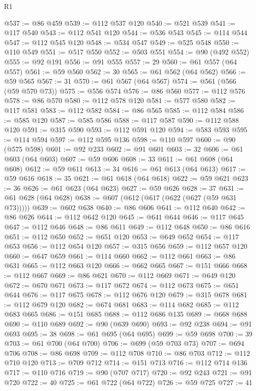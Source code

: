 \begin{lexlean}{R1}
\begin{coremodule}
@537 := @86 @459
@539 := @112 @537 @120
@540 := @521 @539
@541 := @117 @540
@543 := @112 @541 @120
@544 := @536 @543
@545 := @114 @544
@547 := @112 @545 @120
@548 := @534 @547
@549 := @525 @548
@550 := @110 @549
@551 := @517 @550
@552 := @503 @551
@554 := @90 (@492 @552)
@555 := @92 @191
@556 := @91 @555
@557 := 29
@560 := @61 @557 (@64 @557)
@561 := @59 @560
@562 := 30
@565 := @61 @562 (@64 @562)
@566 := @59 @565
@567 := 31
@570 := @61 @567 (@64 @567)
@574 := @561 (@566 (@59 @570 @73))
@575 := @556 @574
@576 := @86 @560
@577 := @112 @576
@578 := @86 @570
@580 := @112 @578 @120
@581 := @577 @580
@582 := @117 @581
@583 := @112 @582
@584 := @86 @565
@585 := @112 @584
@586 := @585 @120
@587 := @585 @586
@588 := @117 @587
@590 := @112 @588 @120
@591 := @315 @590
@593 := @112 @591 @120
@594 := @583 @593
@595 := @114 @594
@597 := @112 @595 @136
@598 := @110 @597
@600 := @90 (@575 @598)
@601 := @92 @233
@602 := @91 @601
@603 := 32
@606 := @61 @603 (@64 @603)
@607 := @59 @606
@608 := 33
@611 := @61 @608 (@64 @608)
@612 := @59 @611
@613 := 34
@616 := @61 @613 (@64 @613)
@617 := @59 @616
@618 := 35
@621 := @61 @618 (@64 @618)
@622 := @59 @621
@623 := 36
@626 := @61 @623 (@64 @623)
@627 := @59 @626
@628 := 37
@631 := @61 @628 (@64 @628)
@638 := @607 (@612 (@617 (@622 (@627 (@59 @631 @73)))))
@639 := @602 @638
@640 := @86 @606
@641 := @112 @640
@642 := @86 @626
@644 := @112 @642 @120
@645 := @641 @644
@646 := @117 @645
@647 := @112 @646
@648 := @86 @611
@649 := @112 @648
@650 := @86 @616
@651 := @112 @650
@652 := @651 @120
@653 := @649 @652
@654 := @117 @653
@656 := @112 @654 @120
@657 := @315 @656
@659 := @112 @657 @120
@660 := @647 @659
@661 := @114 @660
@662 := @112 @661
@663 := @86 @631
@665 := @112 @663 @120
@666 := @662 @665
@667 := @151 @666
@668 := @112 @667
@669 := @86 @621
@670 := @112 @669
@671 := @649 @120
@672 := @670 @671
@673 := @117 @672
@674 := @112 @673
@675 := @651 @644
@676 := @117 @675
@678 := @112 @676 @120
@679 := @315 @678
@681 := @112 @679 @120
@682 := @674 @681
@683 := @114 @682
@685 := @112 @683 @665
@686 := @151 @685
@688 := @112 @686 @135
@689 := @668 @688
@690 := @110 @689
@692 := @90 (@639 @690)
@693 := @92 @238
@694 := @91 @693
@695 := 38
@698 := @61 @695 (@64 @695)
@699 := @59 @698
@700 := 39
@703 := @61 @700 (@64 @700)
@706 := @699 (@59 @703 @73)
@707 := @694 @706
@708 := @86 @698
@709 := @112 @708
@710 := @86 @703
@712 := @112 @710 @120
@713 := @709 @712
@714 := @151 @713
@716 := @112 @714 @136
@717 := @110 @716
@719 := @90 (@707 @717)
@720 := @92 @243
@721 := @91 @720
@722 := 40
@725 := @61 @722 (@64 @722)
@726 := @59 @725
@727 := 41

\end{coremodule}
\end{lexlean}
